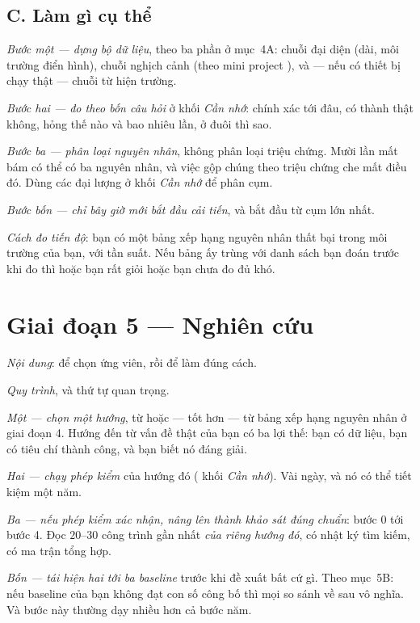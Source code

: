 \documentclass[../../vslam.tex]{subfiles}
\begin{document}
\subsection{C. Làm gì cụ thể}

\emph{Bước một --- dựng bộ dữ liệu}, theo ba phần ở  mục~4A: chuỗi đại diện (dài, môi trường điển hình), chuỗi nghịch cảnh (theo mini project ), và --- nếu có thiết bị chạy thật --- chuỗi từ hiện trường.

\emph{Bước hai --- đo theo bốn câu hỏi} ở  khối \emph{Cần nhớ}: chính xác tới đâu, có thành thật không, hỏng thế nào và bao nhiêu lần, ở đuôi thì sao.

\emph{Bước ba --- phân loại nguyên nhân}, không phân loại triệu chứng. Mười lần mất bám có thể có ba nguyên nhân, và việc gộp chúng theo triệu chứng che mất điều đó. Dùng các đại lượng ở  khối \emph{Cần nhớ} để phân cụm.

\emph{Bước bốn --- chỉ bây giờ mới bắt đầu cải tiến}, và bắt đầu từ cụm lớn nhất.

\emph{Cách đo tiến độ}: bạn có một bảng xếp hạng nguyên nhân thất bại trong môi trường của bạn, với tần suất. Nếu bảng ấy trùng với danh sách bạn đoán trước khi đo thì hoặc bạn rất giỏi hoặc bạn chưa đo đủ khó.

\section{Giai đoạn 5 --- Nghiên cứu}

\emph{Nội dung}:  để chọn ứng viên, rồi  để làm đúng cách.

\emph{Quy trình}, và thứ tự quan trọng.

\emph{Một --- chọn một hướng}, từ  hoặc --- tốt hơn --- từ bảng xếp hạng nguyên nhân ở giai đoạn 4. Hướng đến từ vấn đề thật của bạn có ba lợi thế: bạn có dữ liệu, bạn có tiêu chí thành công, và bạn biết nó đáng giải.

\emph{Hai --- chạy phép kiểm} của hướng đó ( khối \emph{Cần nhớ}). Vài ngày, và nó có thể tiết kiệm một năm.

\emph{Ba --- nếu phép kiểm xác nhận, nâng lên thành khảo sát đúng chuẩn}:  bước 0 tới bước 4. Đọc \(20\)--\(30\) công trình gần nhất \emph{của riêng hướng đó}, có nhật ký tìm kiếm, có ma trận tổng hợp.

\emph{Bốn --- tái hiện hai tới ba baseline} trước khi đề xuất bất cứ gì. Theo  mục~5B: nếu baseline của bạn không đạt con số công bố thì mọi so sánh về sau vô nghĩa. Và bước này thường dạy nhiều hơn cả bước năm.
\end{document}
